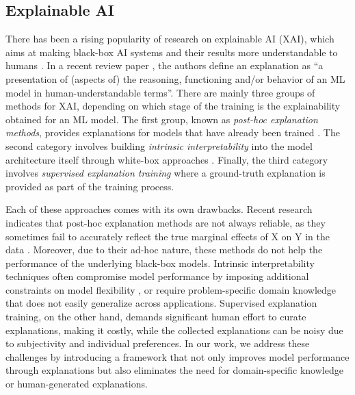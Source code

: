 


\subsection{Explainable AI}

There has been a rising popularity of research on explainable AI (XAI), which aims at making black-box AI systems and their results more understandable to humans \citep{adadi2018peeking}. In a recent review paper \citep{nauta2023anecdotal}, the authors define an explanation as ``a presentation of (aspects of) the reasoning, functioning and/or behavior of an ML model in human-understandable terms''. There are mainly three groups of methods for XAI, depending on which stage of the training is the explainability obtained for an ML model. The first group, known as \emph{post-hoc explanation methods}, provides explanations for models that have already been trained \citep{chen2018learning, oramas2017visual, wagner2019interpretable, lundberg2017unified}. The second category involves building \emph{intrinsic interpretability} into the model architecture itself through white-box approaches \citep{pan2021explainable, subramanian2020obtaining, zhang2024optimal}. Finally, the third category involves \emph{supervised explanation training} where a ground-truth explanation is provided as part of the training process. 
 
Each of these approaches comes with its own drawbacks. 
Recent research indicates that post-hoc explanation methods are not always reliable, as they sometimes fail to accurately reflect the true marginal effects of X on Y in the data \citep{ragodos2024risk}. Moreover, due to their ad-hoc nature, these methods do not help the performance of the underlying black-box models. Intrinsic interpretability techniques often compromise model performance by imposing additional constraints on model flexibility \citep{zhang2024optimal}, or require problem-specific domain knowledge \citep{fong2024theory, sisodia2024generative} that does not easily generalize across applications. Supervised explanation training, on the other hand, demands significant human effort to curate explanations, making it costly, while the collected explanations can be noisy due to subjectivity and individual preferences. In our work, we address these challenges by introducing a framework that not only improves model performance through explanations but also eliminates the need for domain-specific knowledge or human-generated explanations.


